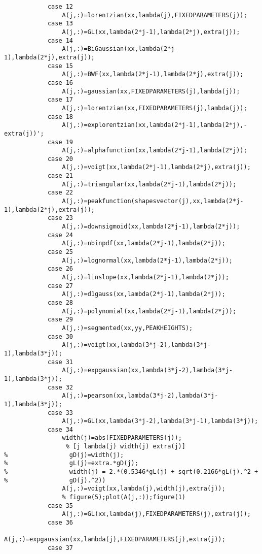 \begin{lstlisting}
            case 12
                A(j,:)=lorentzian(xx,lambda(j),FIXEDPARAMETERS(j));
            case 13
                A(j,:)=GL(xx,lambda(2*j-1),lambda(2*j),extra(j));
            case 14
                A(j,:)=BiGaussian(xx,lambda(2*j-1),lambda(2*j),extra(j));
            case 15
                A(j,:)=BWF(xx,lambda(2*j-1),lambda(2*j),extra(j));
            case 16
                A(j,:)=gaussian(xx,FIXEDPARAMETERS(j),lambda(j));
            case 17
                A(j,:)=lorentzian(xx,FIXEDPARAMETERS(j),lambda(j));
            case 18
                A(j,:)=explorentzian(xx,lambda(2*j-1),lambda(2*j),-extra(j))';
            case 19
                A(j,:)=alphafunction(xx,lambda(2*j-1),lambda(2*j));
            case 20
                A(j,:)=voigt(xx,lambda(2*j-1),lambda(2*j),extra(j));
            case 21
                A(j,:)=triangular(xx,lambda(2*j-1),lambda(2*j));
            case 22
                A(j,:)=peakfunction(shapesvector(j),xx,lambda(2*j-1),lambda(2*j),extra(j));
            case 23
                A(j,:)=downsigmoid(xx,lambda(2*j-1),lambda(2*j));      
            case 24
                A(j,:)=nbinpdf(xx,lambda(2*j-1),lambda(2*j));
            case 25
                A(j,:)=lognormal(xx,lambda(2*j-1),lambda(2*j));
            case 26
                A(j,:)=linslope(xx,lambda(2*j-1),lambda(2*j));
            case 27
                A(j,:)=d1gauss(xx,lambda(2*j-1),lambda(2*j));       
            case 28
                A(j,:)=polynomial(xx,lambda(2*j-1),lambda(2*j));       
            case 29
                A(j,:)=segmented(xx,yy,PEAKHEIGHTS);
            case 30
                A(j,:)=voigt(xx,lambda(3*j-2),lambda(3*j-1),lambda(3*j));        
            case 31
                A(j,:)=expgaussian(xx,lambda(3*j-2),lambda(3*j-1),lambda(3*j));        
            case 32
                A(j,:)=pearson(xx,lambda(3*j-2),lambda(3*j-1),lambda(3*j));        
            case 33
                A(j,:)=GL(xx,lambda(3*j-2),lambda(3*j-1),lambda(3*j));
            case 34
                width(j)=abs(FIXEDPARAMETERS(j));
                 % [j lambda(j) width(j) extra(j)]
%                 gD(j)=width(j);
%                 gL(j)=extra.*gD(j);
%                 width(j) = 2.*(0.5346*gL(j) + sqrt(0.2166*gL(j).^2 +
%                 gD(j).^2))
                A(j,:)=voigt(xx,lambda(j),width(j),extra(j));
                % figure(5);plot(A(j,:));figure(1)
            case 35
                A(j,:)=GL(xx,lambda(j),FIXEDPARAMETERS(j),extra(j));
            case 36
                A(j,:)=expgaussian(xx,lambda(j),FIXEDPARAMETERS(j),extra(j));
            case 37

\end{lstlisting}
